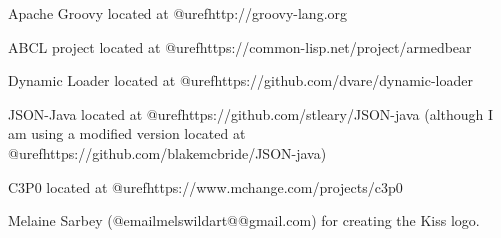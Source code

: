 Apache Groovy located at @uref{http://groovy-lang.org}

ABCL project located at @uref{https://common-lisp.net/project/armedbear}

Dynamic Loader located at @uref{https://github.com/dvare/dynamic-loader}

JSON-Java located at @uref{https://github.com/stleary/JSON-java} (although
I am using a modified version located at @uref{https://github.com/blakemcbride/JSON-java})

C3P0 located at @uref{https://www.mchange.com/projects/c3p0}

Melaine Sarbey (@email{melswildart@@gmail.com}) for creating the Kiss logo.

